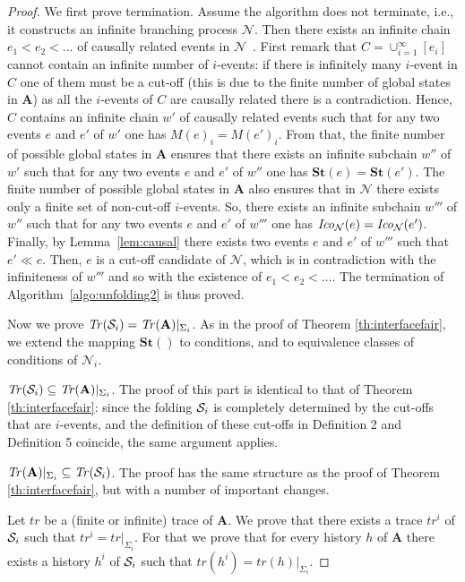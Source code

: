\documentclass{llncs}
\def\prod{\mathbf{A}}
\def\N{\mathcal{N}}
\def\S{\mathcal{S}}
\def\scause{\ll}
\newcommand{\st}[1]{\mathbf{St}(#1)}
\def\ocseq{w}
\newcommand{\Tr}[1]{{\it Tr}(#1)}
\newcommand{\Coni}[2]{{\it Ico}_{#1}(#2)}
\renewcommand{\S}{{\cal S}}
\def\trace{tr}
\begin{document}
\begin{proof}
We first prove termination. Assume the algorithm does not terminate, i.e., it constructs an
infinite branching process $\N$.
Then there exists an infinite chain $e_1<e_2<...$ of causally related events in $\N$~\cite{Khomenko03}.
First remark that $C=\cup_{i=1}^\infty [e_i]$ cannot contain an infinite number of $i$-events:
if there is infinitely many $i$-event in $C$ one of them must be a cut-off (this is due to the finite number of global states in $\prod$) as all the $i$-events of $C$ are causally related there is a contradiction.
Hence, $C$ contains an infinite chain $\ocseq'$ of causally related events such that for any two events $e$ and $e'$ of $\ocseq'$ one has $M(e)_i=M(e')_i$.
From that, the finite number of possible global states in $\prod$ ensures that there exists an infinite subchain $\ocseq''$ of $\ocseq'$ such that for any two events $e$ and $e'$ of $\ocseq''$ one has $\st{e}=\st{e'}$. 
The finite number of possible global states in $\prod$ also ensures that in $\N$ there exists only a finite set of non-cut-off $i$-events.
So, there exists an infinite subchain $\ocseq'''$ of $\ocseq''$ such that for any two events $e$ and $e'$ of $\ocseq'''$ one has $\Coni{\N}{e}=\Coni{\N}{e'}$.
Finally, by Lemma~\ref{lem:causal} there exists two events $e$ and $e'$ of $\ocseq'''$ such that $e'\scause e$.
Then, $e$ is a cut-off candidate of $\N$, which is in contradiction with the infiniteness of $\ocseq'''$ and so with the existence of $e_1<e_2<\dots$.
The termination of Algorithm~\ref{algo:unfolding2} is thus proved.

\vspace{0.2cm}
Now we prove $\Tr{\S_i}=\Tr{\prod}|_{\Sigma_i}$. As in the proof of Theorem 
\ref{th:interfacefair}, we extend the mapping $\st{}$ to conditions, and to equivalence classes of
conditions of $\N_i$. 

$\Tr{\S_i} \subseteq \Tr{\prod}|_{\Sigma_i}$. The proof of this part is identical to
that of Theorem \ref{th:interfacefair}: since the folding $\S_i$ is completely determined by the cut-offs
that are $i$-events, and the definition of these cut-offs in Definition 2 and Definition 5
coincide, the same argument applies. 

$\Tr{\prod}|_{\Sigma_i} \subseteq \Tr{\S_i}$. The proof has the same structure 
as the proof of Theorem \ref{th:interfacefair}, but with a number of important changes. 

Let $\trace$ be a (finite or infinite) trace of $\prod$.
We prove that there exists a trace $\trace^i$ of $\S_i$ such that $\trace^i=\trace|_{\Sigma_i}$.
For that we prove that for every history $h$ of $\prod$ there exists a history $h^i$ of $\S_i$ 
such that $\trace(h^i)=\trace(h)|_{\Sigma_i}$.


\end{proof}
\end{document}
